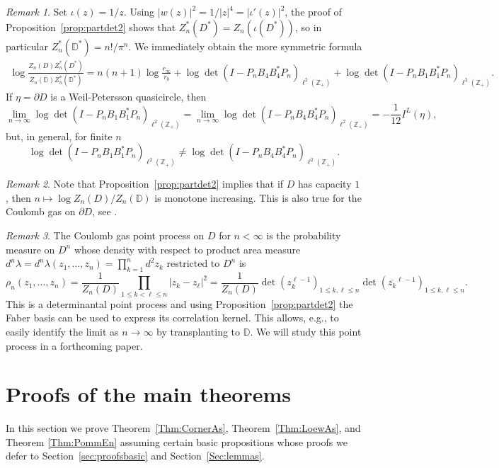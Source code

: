\documentclass{article}
\numberwithin{equation}{section}
\numberwithin{figure}{section}
\theoremstyle{plain}
\theoremstyle{plain}
\numberwithin{thm}{section}
\theoremstyle{remark}
\newtheorem*{rem}{Remark}
\newcommand{\D}{\mathbb{D}}
\newcommand{\Z}{\mathbb{Z}}
\let \le \leqslant
\begin{document}
\begin{rem}
    Set $\iota(z) = 1/z$. Using $|w(z)|^2 = 1/|z|^4=|\iota'(z)|^2$, the proof of Proposition~\ref{prop:partdet2} shows that $Z_n^*(D^*)=Z_n(\iota(D^*))$, so in particular $Z_n^*(\D^*) = n!/\pi^n$. We immediately obtain the more symmetric formula
    \begin{align}\label{symmetricformula}
        \log \frac{Z_n(D)Z_n^*(D^*)}{Z_n(\D)Z_n^*(\D^*)} = n(n+1)\log \frac{r_\infty}{r_0} + \log \det(I-P_nB_4B_4^*P_n)_{\ell^2(\Z_+)} + \log \det(I-P_nB_1B_1^*P_n)_{\ell^2(\Z_+)}.
    \end{align}
    If $\eta = \partial D$ is a Weil-Petersson quasicircle, then
    \[
    \lim_{n \to \infty} \log \det(I-P_nB_1B_1^*P_n)_{\ell^2(\Z_+)} =    \lim_{n \to \infty} \log \det(I-P_nB_4B_4^*P_n)_{\ell^2(\Z_+)} = - \frac{1}{12}I^L(\eta),
    \]
    but, in general, for finite $n$ 
    \[
    \log \det(I-P_nB_1B_1^*P_n)_{\ell^2(\Z_+)} \neq \log \det(I-P_nB_4B_4^*P_n)_{\ell^2(\Z_+)}.
    \]
     \end{rem}
\begin{rem}
    Note that Proposition~\ref{prop:partdet2} implies that if $D$ has capacity $1$, then $n \mapsto \log Z_n(D)/Z_n(\D)$ is monotone increasing. This is also true for the Coulomb gas on $\partial D$, see \cite{Jo}.
    \end{rem}
\begin{rem}
The Coulomb gas point process on $D$ for $n <\infty$ is the probability measure on $D^n$ whose density with respect to product area measure $d^n \lambda = d^n \lambda(z_1,\ldots, z_n)=\prod_{k=1}^n d^2 z_k$ restricted to $D^n$ is
    \[
    \rho_n(z_1,\ldots, z_n) = \frac{1}{Z_n(D)} \prod_{1\le k < \ell \le n}|z_k -z_\ell|^2 = \frac{1}{Z_n(D)} \det(z_k^{\ell-1})_{1 \le k,\ell \le n}\det(\overline{z_k}^{\ell-1})_{1 \le k,\ell \le n}.
    \]
This is a determinantal point process and using Proposition~\ref{prop:partdet2} the Faber basis can be used to express its correlation kernel. This allows, e.g., to easily identify the limit as $n \to \infty$ by transplanting to $\D$. We will study this point process in a forthcoming paper. 
\end{rem}

\section{Proofs of the main theorems}\label{Sec:propthm}
In this section we prove Theorem~\ref{Thm:CornerAs}, Theorem~\ref{Thm:LoewAs}, and Theorem \ref{Thm:PommEn} assuming certain basic propositions whose proofs we defer to Section~\ref{sec:proofsbasic} and Section~\ref{Sec:lemmas}. 
\end{document}
